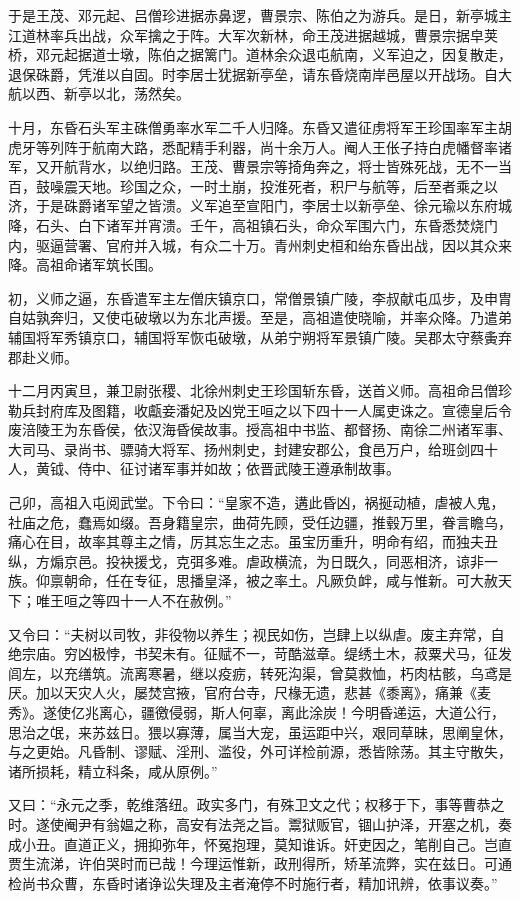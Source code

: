\documentclass[12pt,UTF8]{ctexbook}
\begin{document}
于是王茂、邓元起、吕僧珍进据赤鼻逻，曹景宗、陈伯之为游兵。是日，新亭城主江道林率兵出战，众军擒之于阵。大军次新林，命王茂进据越城，曹景宗据皁荚桥，邓元起据道士墩，陈伯之据篱门。道林余众退屯航南，义军迫之，因复散走，退保硃爵，凭淮以自固。时李居士犹据新亭垒，请东昏烧南岸邑屋以开战场。自大航以西、新亭以北，荡然矣。

十月，东昏石头军主硃僧勇率水军二千人归降。东昏又遣征虏将军王珍国率军主胡虎牙等列阵于航南大路，悉配精手利器，尚十余万人。阉人王伥子持白虎幡督率诸军，又开航背水，以绝归路。王茂、曹景宗等掎角奔之，将士皆殊死战，无不一当百，鼓噪震天地。珍国之众，一时土崩，投淮死者，积尸与航等，后至者乘之以济，于是硃爵诸军望之皆溃。义军追至宣阳门，李居士以新亭垒、徐元瑜以东府城降，石头、白下诸军并宵溃。壬午，高祖镇石头，命众军围六门，东昏悉焚烧门内，驱逼营署、官府并入城，有众二十万。青州刺史桓和绐东昏出战，因以其众来降。高祖命诸军筑长围。

初，义师之逼，东昏遣军主左僧庆镇京口，常僧景镇广陵，李叔献屯瓜步，及申胄自姑孰奔归，又使屯破墩以为东北声援。至是，高祖遣使晓喻，并率众降。乃遣弟辅国将军秀镇京口，辅国将军恢屯破墩，从弟宁朔将军景镇广陵。吴郡太守蔡夤弃郡赴义师。

十二月丙寅旦，兼卫尉张稷、北徐州刺史王珍国斩东昏，送首义师。高祖命吕僧珍勒兵封府库及图籍，收甗妾潘妃及凶党王咺之以下四十一人属吏诛之。宣德皇后令废涪陵王为东昏侯，依汉海昏侯故事。授高祖中书监、都督扬、南徐二州诸军事、大司马、录尚书、骠骑大将军、扬州刺史，封建安郡公，食邑万户，给班剑四十人，黄钺、侍中、征讨诸军事并如故；依晋武陵王遵承制故事。

己卯，高祖入屯阅武堂。下令曰：“皇家不造，遘此昏凶，祸挻动植，虐被人鬼，社庙之危，蠢焉如缀。吾身籍皇宗，曲荷先顾，受任边疆，推毂万里，眷言瞻乌，痛心在目，故率其尊主之情，厉其忘生之志。虽宝历重升，明命有绍，而独夫丑纵，方煽京邑。投袂援戈，克弭多难。虐政横流，为日既久，同恶相济，谅非一族。仰禀朝命，任在专征，思播皇泽，被之率土。凡厥负衅，咸与惟新。可大赦天下；唯王咺之等四十一人不在赦例。”

又令曰：“夫树以司牧，非役物以养生；视民如伤，岂肆上以纵虐。废主弃常，自绝宗庙。穷凶极悖，书契未有。征赋不一，苛酷滋章。缇绣土木，菽粟犬马，征发闾左，以充缮筑。流离寒暑，继以疫疬，转死沟渠，曾莫救恤，朽肉枯骸，乌鸢是厌。加以天灾人火，屡焚宫掖，官府台寺，尺椽无遗，悲甚《黍离》，痛兼《麦秀》。遂使亿兆离心，疆徼侵弱，斯人何辜，离此涂炭！今明昏递运，大道公行，思治之氓，来苏兹日。猥以寡薄，属当大宠，虽运距中兴，艰同草昧，思阐皇休，与之更始。凡昏制、谬赋、淫刑、滥役，外可详检前源，悉皆除荡。其主守散失，诸所损耗，精立科条，咸从原例。”

又曰：“永元之季，乾维落纽。政实多门，有殊卫文之代；权移于下，事等曹恭之时。遂使阉尹有翁媪之称，高安有法尧之旨。鬻狱贩官，锢山护泽，开塞之机，奏成小丑。直道正义，拥抑弥年，怀冤抱理，莫知谁诉。奸吏因之，笔削自己。岂直贾生流涕，许伯哭时而已哉！今理运惟新，政刑得所，矫革流弊，实在兹日。可通检尚书众曹，东昏时诸诤讼失理及主者淹停不时施行者，精加讯辨，依事议奏。”
\end{document}
